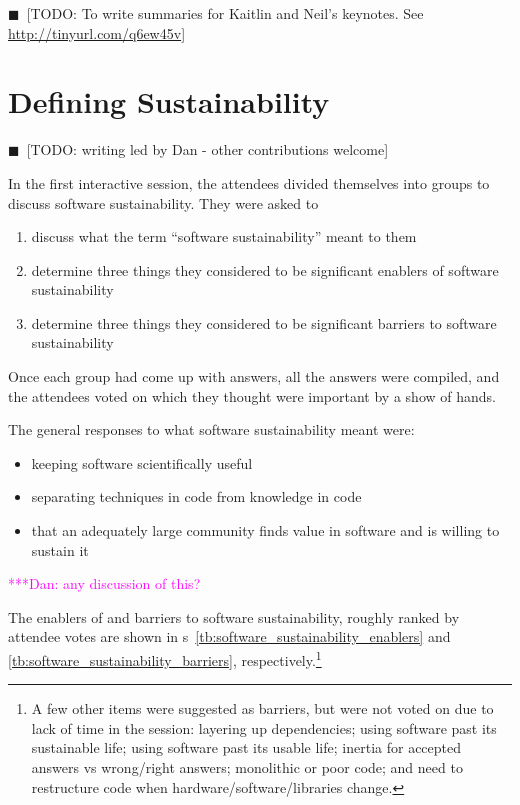 \documentclass[11pt, oneside]{amsart}
\newcommand{\todo}[1]{{\color{blue}$\blacksquare$~\textsf{[TODO: #1]}}}
\newcommand{\katznote}[1]{ {\textcolor{magenta}    { ***Dan:      #1 }}}
\begin{document}
\todo{To write summaries for Kaitlin and Neil's keynotes. See 
\url{http://tinyurl.com/q6ew45v}}


\section{Defining Sustainability}
\todo{writing led by Dan - other contributions welcome}

In the first interactive session, the attendees divided themselves into groups
to discuss software sustainability. They were asked to
\begin{enumerate}
\item discuss what the term ``software sustainability'' meant to them

\item determine three things they considered to be significant enablers of
software sustainability

\item determine three things they considered to be significant barriers to
software sustainability
\end{enumerate}
Once each group had come up with answers, all the answers were compiled, and the
attendees voted on which they thought were important by a show of hands.

The general responses to what software sustainability meant were:
\begin{itemize}
\item keeping software scientifically useful
\item separating techniques in code from knowledge in code
\item that an adequately large community finds value in software and is willing
to sustain it
\end{itemize}

\katznote{any discussion of this?}

The enablers of and barriers to software sustainability, roughly ranked by
attendee votes are shown in
{\tablename}s~\ref{tb:software_sustainability_enablers} and
\ref{tb:software_sustainability_barriers}, respectively.\footnote{A few other
items were suggested as barriers, but were not voted on due to lack of time in
the session:
layering up dependencies;
using software past its sustainable life;
using software past its usable life;
inertia for accepted answers vs wrong/right answers;
monolithic or poor code; and
need to restructure code when hardware/software/libraries change.
}
\end{document}
